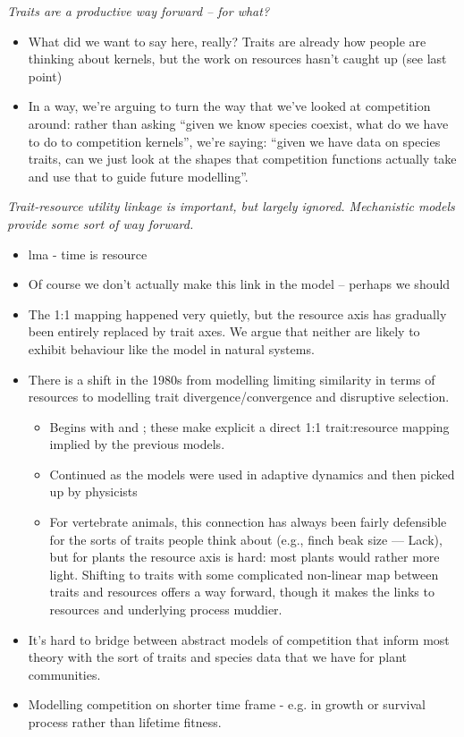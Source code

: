 \documentclass[a4paper,11pt]{article}
\begin{document}
\textit{Traits are a productive way forward -- for what?}

\begin{itemize}
\item What did we want to say here, really?  Traits are already how
  people are thinking about kernels, but the work on resources hasn't
  caught up (see last point)
\item In a way, we're arguing to turn the way that we've looked at
  competition around: rather than asking ``given we know species
  coexist, what do we have to do to competition kernels'', we're
  saying: ``given we have data on species traits, can we just look at
  the shapes that competition functions actually take and use that to
  guide future modelling''.
\end{itemize}


\textit{Trait-resource utility linkage is important, but largely
  ignored.  Mechanistic models provide some sort of way forward.}

\begin{itemize}
\item lma - time is resource
\item Of course we don't actually make this link in the model --
  perhaps we should
\item The 1:1 mapping happened very quietly, but the resource axis has
  gradually been entirely replaced by trait axes.  We argue that
  neither are likely to exhibit behaviour like the
  \citet{MacArthur-1967} model in natural systems.
\item There is a shift in the 1980s from modelling limiting
  similarity in terms of resources to modelling trait
  divergence/convergence and disruptive selection.
  \begin{itemize}
  \item Begins with \citet{Taper-1985} and \citet{Brown-1987-140}; these
    make explicit a direct 1:1 trait:resource mapping implied by the
    previous models.
  \item Continued as the models were used in adaptive dynamics
    \citep[e.g.,][]{Dieckmann-1999} and then picked up by physicists
    \citep[e.g.,][]{Leimar-2013}
  \item For vertebrate animals, this connection has always been fairly
    defensible for the sorts of traits people think about (e.g., finch
    beak size --- Lack), but for plants the resource axis is hard: most
    plants would rather more light.  Shifting to traits with some
    complicated non-linear map between traits and resources offers a way
    forward, though it makes the links to resources and underlying
    process muddier.
  \end{itemize}
\item It's hard to bridge between abstract models of competition that
  inform most theory with the sort of traits and species data that we
  have for plant communities.
\item Modelling competition on shorter time frame - e.g. in growth or
survival process rather than lifetime fitness. 
\end{itemize}
\end{document}

